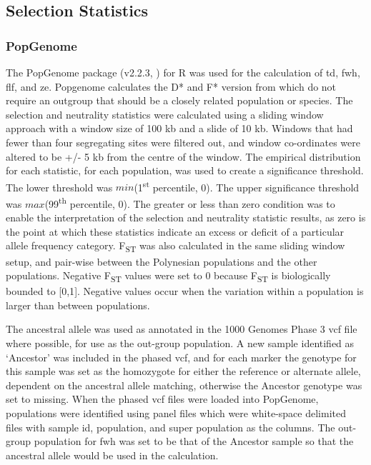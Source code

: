 \documentclass[twoside,openright]{report}
\begin{document}
\subsection{Selection Statistics}\label{selection-statistics}

\subsubsection{PopGenome}\label{popgenomeMethods}

The PopGenome package (v2.2.3, \citet{Pfeifer2014}) for R was used for
the calculation of \gls{td}, \gls{fwh}, \gls{flf}, and \gls{ze}.
Popgenome calculates the D* and F* version from \citet{Fu1993} which do
not require an outgroup that should be a closely related population or
species. The selection and neutrality statistics were calculated using a
sliding window approach with a window size of 100 kb and a slide of 10
kb. Windows that had fewer than four segregating sites were filtered
out, and window co-ordinates were altered to be +/- 5 kb from the centre
of the window. The empirical distribution for each statistic, for each
population, was used to create a significance threshold. The lower
threshold was \(min\)(1\textsuperscript{st} percentile, 0). The upper
significance threshold was \(max\)(99\textsuperscript{th} percentile,
0). The greater or less than zero condition was to enable the
interpretation of the selection and neutrality statistic results, as
zero is the point at which these statistics indicate an excess or
deficit of a particular allele frequency category. F\textsubscript{ST}
was also calculated in the same sliding window setup, and pair-wise
between the Polynesian populations and the other populations. Negative
F\textsubscript{ST} values were set to 0 because F\textsubscript{ST} is
biologically bounded to {[}0,1{]}. Negative values occur when the
variation within a population is larger than between populations.

The ancestral allele was used as annotated in the 1000 Genomes Phase 3
\gls{vcf} file where possible, for use as the out-group population. A
new sample identified as `Ancestor' was included in the phased
\gls{vcf}, and for each marker the genotype for this sample was set as
the homozygote for either the reference or alternate allele, dependent
on the ancestral allele matching, otherwise the Ancestor genotype was
set to missing. When the phased \gls{vcf} files were loaded into
PopGenome, populations were identified using panel files which were
white-space delimited files with sample id, population, and super
population as the columns. The out-group population for \gls{fwh} was
set to be that of the Ancestor sample so that the ancestral allele would
be used in the calculation.
\end{document}
